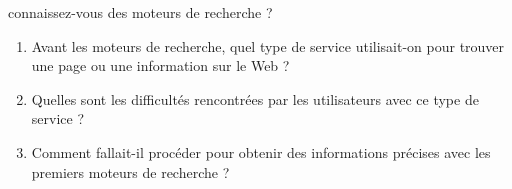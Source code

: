 \documentclass[a4paper, dvipsnames]{article}
\begin{document}
\begin{activite}[breakable]{connaissez-vous des moteurs de recherche ?}{}
\begin{enumerate}
      \begin{enumerate}
	\item Avant les moteurs de recherche, quel type de service utilisait-on pour trouver une page ou une information sur le Web ?
	\item Quelles sont les difficultés rencontrées par les utilisateurs avec ce type de service ?
	\item Comment fallait-il procéder pour obtenir des informations précises avec les premiers moteurs de recherche ?
      \end{enumerate}
  \end{enumerate} 
\end{activite}

%
%
%
\end{document}
